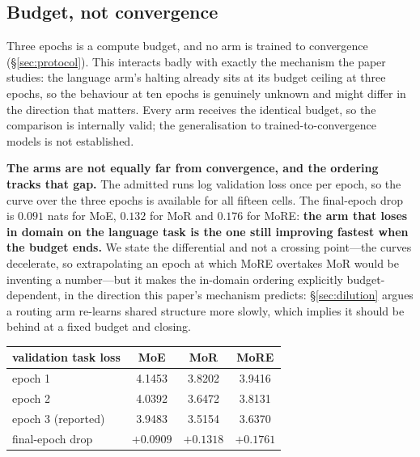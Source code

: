 \subsection{Budget, not convergence}
\label{sec:budget}

Three epochs is a compute budget, and no arm is trained to convergence
(\S\ref{sec:protocol}). This interacts badly with exactly the mechanism the paper
studies: the language arm's halting already sits at its budget ceiling at three
epochs, so the behaviour at ten epochs is genuinely unknown and might
differ in the direction that matters. Every arm receives the identical budget, so
the comparison is internally valid; the generalisation to trained-to-convergence
models is not established.

\textbf{The arms are not equally far from convergence, and the ordering tracks
that gap.} The admitted runs log validation loss once per epoch, so the curve over
the three epochs is available for all fifteen cells. The final-epoch drop is
$0.091$ nats for MoE, $0.132$ for MoR and $0.176$ for MoRE: \textbf{the arm that
loses in domain on the language task is the one still improving fastest when the
budget ends.} We state
the differential and not a crossing point---the curves decelerate, so extrapolating
an epoch at which MoRE overtakes MoR would be inventing a number---but it makes the
in-domain ordering explicitly budget-dependent, in the direction this paper's
mechanism predicts: \S\ref{sec:dilution} argues a routing arm re-learns shared
structure more slowly, which implies it should be behind at a fixed budget and
closing.

\begin{center}
{\dispsize
\setlength{\tabcolsep}{4pt}\renewcommand{\arraystretch}{1.25}
\small
\begin{tabular}{lccc}
\toprule
validation task loss & MoE & MoR & MoRE \\
\midrule
epoch 1 & 4.1453 & 3.8202 & 3.9416 \\
epoch 2 & 4.0392 & 3.6472 & 3.8131 \\
epoch 3 (reported) & 3.9483 & 3.5154 & 3.6370 \\
\midrule
final-epoch drop & $+0.0909$ & $+0.1318$ & $\mathbf{+0.1761}$ \\
\bottomrule
\end{tabular}
}
\end{center}

